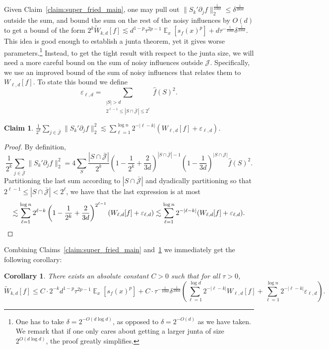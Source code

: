 \documentclass[10pt]{article}
\newcommand{\card}[1]{\left\lvert #1\right\rvert}
\newcommand{\Expect}[2]{{\mathop{\mathbb E}_{#1}\left[#2\right]}}
\newcommand{\norm}[1]{\lVert #1\rVert}
\newcommand{\eps}{\varepsilon}
\renewcommand{\ll}{\lesssim}
\newtheorem{corollary}[thm]{Corollary}
\newtheorem{claim}[thm]{Claim}
\begin{document}
Given Claim~\ref{claim:super_fried_main}, one may pull out $\norm{S_k' \partial_j f}_2^{\frac{1}{100 d}}\leq \delta^{\frac{1}{200d}}$ outside
the sum, and bound the sum on the rest of the noisy influences by $O(d)$ to get a bound of the form
$2^k \tilde{W}_{k,d}[f]\ll d^{1-p}\tau^{2p-1} \Expect{x}{s_f(x)^p} + d\tau^{-\frac{1}{100 d}}\delta^{\frac{1}{200d}}$.
This idea is good enough to establish a junta theorem, yet it gives worse parameters.\footnote{One has to take
$\delta = 2^{-O(d\log d)}$, as opposed to $\delta = 2^{-O(d)}$ as we have taken. We remark that if one only cares
about getting a larger junta of size $2^{O(d\log d)}$, the proof greatly simplifies.} Instead, to get the tight result with respect
to the junta size, we will need a more careful bound on the sum of noisy influences outside $\mathcal{J}$. Specifically,
we use an improved bound of the sum of noisy influences that relates them to $W_{\ell,d}[f]$.
To state this bound we define
\[
\eps_{\ell,d} = \sum\limits_{\substack{\card{S}>d\\ 2^{\ell-1}\leq \card{S\cap \bar{\mathcal{J}}}\leq 2^{\ell}}} \widehat{f}(S)^2.
\]
 \begin{claim}\label{claim:bound_low_deg_inf}
    $\frac{1}{2^k}\sum\limits_{j\in\bar{\mathcal{J}}} \norm{S_k' \partial_j f}_2^{2}\ll \sum\limits_{\ell=1}^{\log n} 2^{-\card{\ell-k}}(W_{\ell,d}[f]+\eps_{\ell, d})$.
  \end{claim}
  \begin{proof}
    By definition,
    \[
    \frac{1}{2^k}\sum\limits_{j\in\bar{\mathcal{J}}} \norm{S_k' \partial_j f}_2^{2}
    =4\sum\limits_{S} \frac{\card{S\cap \bar{\mathcal{J}}}}{2^k} \left(1-\frac{1}{2^k}+\frac{2}{3d}\right)^{\card{S\cap \bar{\mathcal{J}}}-1}\left(1-\frac{1}{3d}\right)^{\card{S\cap \mathcal{J}}}\widehat{f}(S)^2.
    \]
    Partitioning the last sum according to $\card{S\cap \bar{\mathcal{J}}}$ and dyadically partitioning so that $2^{\ell-1}\leq \card{S\cap \bar{\mathcal{J}}} < 2^{\ell}$, we have that the last
    expression is at most
    \[
    \ll
    \sum\limits_{\ell=1}^{\log n} 2^{\ell-k} \left(1-\frac{1}{2^k}+\frac{2}{3d}\right)^{2^{\ell-1}}(W_{\ell,d}[f]+\eps_{\ell, d})
    \ll
    \sum\limits_{\ell=1}^{\log n} 2^{-\card{\ell-k}}(W_{\ell,d}[f]+\eps_{\ell, d}).\qedhere
    \]
  \end{proof}

    Combining Claims~\ref{claim:super_fried_main} and~\ref{claim:bound_low_deg_inf} we immediately get the following corollary:
\begin{corollary}\label{corr:bound_low_deg_inf}
  There exists an absolute constant $C>0$ such that for all $\tau>0$,
    \[
    \tilde{W}_{k,d}[f]\leq C\cdot 2^{-k} d^{1-p}\tau^{2p-1} \Expect{x}{s_f(x)^p}
    +C\cdot \tau^{-\frac{1}{100 d}}\delta^{\frac{1}{200 d}}
    \left(\sum\limits_{\ell=1}^{\log d} 2^{-\card{\ell-k}}W_{\ell,d}[f]+\sum\limits_{\ell=1}^{\log n} 2^{-\card{\ell-k}}\eps_{\ell, d}\right).
    \]
\end{corollary}
\end{document}
